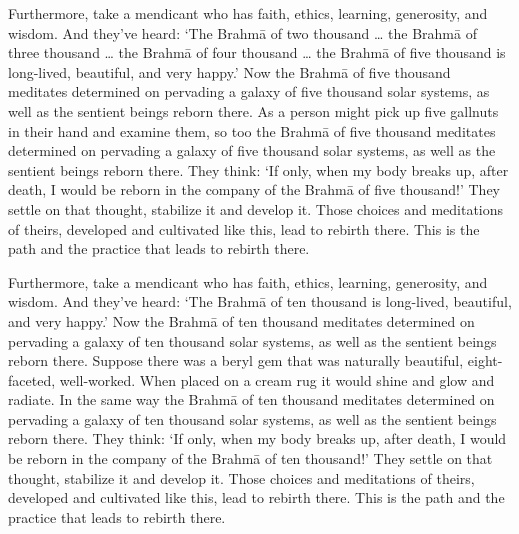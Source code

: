 \documentclass[12pt,openany]{book}%
\begin{document}
Furthermore, take a mendicant who has faith, ethics, learning, generosity, and wisdom. And they’ve heard: ‘The \textsanskrit{Brahmā} of two thousand … the \textsanskrit{Brahmā} of three thousand … the \textsanskrit{Brahmā} of four thousand … the \textsanskrit{Brahmā} of five thousand is long-lived, beautiful, and very happy.’ Now the \textsanskrit{Brahmā} of five thousand meditates determined on pervading a galaxy of five thousand solar systems, as well as the sentient beings reborn there. As a person might pick up five gallnuts in their hand and examine them, so too the \textsanskrit{Brahmā} of five thousand meditates determined on pervading a galaxy of five thousand solar systems, as well as the sentient beings reborn there. They think: ‘If only, when my body breaks up, after death, I would be reborn in the company of the \textsanskrit{Brahmā} of five thousand!’ They settle on that thought, stabilize it and develop it. Those choices and meditations of theirs, developed and cultivated like this, lead to rebirth there. This is the path and the practice that leads to rebirth there. 

Furthermore, take a mendicant who has faith, ethics, learning, generosity, and wisdom. And they’ve heard: ‘The \textsanskrit{Brahmā} of ten thousand is long-lived, beautiful, and very happy.’ Now the \textsanskrit{Brahmā} of ten thousand meditates determined on pervading a galaxy of ten thousand solar systems, as well as the sentient beings reborn there. Suppose there was a beryl gem that was naturally beautiful, eight-faceted, well-worked. When placed on a cream rug it would shine and glow and radiate. In the same way the \textsanskrit{Brahmā} of ten thousand meditates determined on pervading a galaxy of ten thousand solar systems, as well as the sentient beings reborn there. They think: ‘If only, when my body breaks up, after death, I would be reborn in the company of the \textsanskrit{Brahmā} of ten thousand!’ They settle on that thought, stabilize it and develop it. Those choices and meditations of theirs, developed and cultivated like this, lead to rebirth there. This is the path and the practice that leads to rebirth there. 
\end{document}
